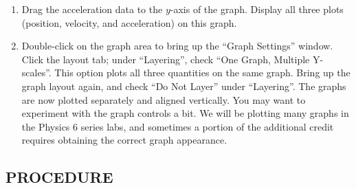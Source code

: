 \begin{enumerate}[label=\arabic*.]
\item Drag the acceleration data to the \(y\)-axis of the graph.  Display all three plots (position, velocity, and acceleration) on this graph.

\item Double-click on the graph area to bring up the ``Graph Settings'' window.  Click the layout tab; under ``Layering'', check ``One Graph, Multiple Y-scales''.  This option plots all three quantities on the same graph.  Bring up the graph layout again, and check ``Do Not Layer'' under ``Layering''.  The graphs are now plotted separately and aligned vertically.  You may want to experiment with the graph controls a bit.  We will be plotting many graphs in the Physics 6 series labs, and sometimes a portion of the additional credit requires obtaining the correct graph appearance.

\end{enumerate}

\subsection*{PROCEDURE}


